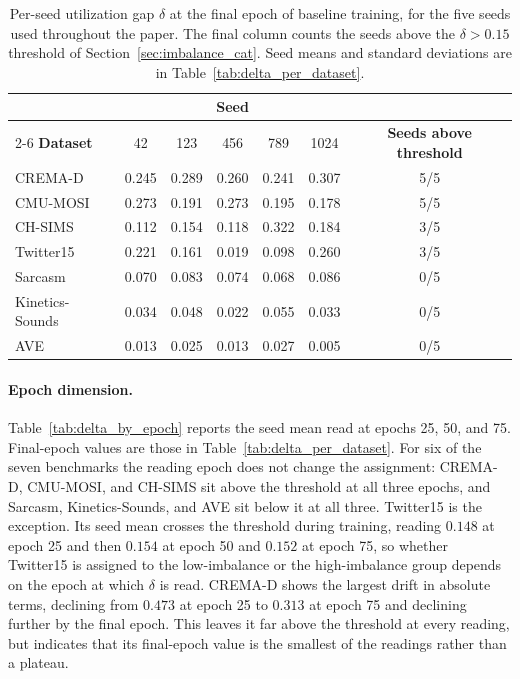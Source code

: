 \documentclass{article}
\begin{document}
\begin{table}[H]
\centering
\caption{Per-seed utilization gap $\delta$ at the final epoch of baseline training, for the five seeds used throughout the paper. The final column counts the seeds above the $\delta > 0.15$ threshold of Section~\ref{sec:imbalance_cat}. Seed means and standard deviations are in Table~\ref{tab:delta_per_dataset}.}
\label{tab:delta_per_seed}
\vspace{0.3em}
\begin{tabular}{lcccccc}
\toprule
& \multicolumn{5}{c}{\textbf{Seed}} & \\
\cmidrule(lr){2-6}
\textbf{Dataset} & 42 & 123 & 456 & 789 & 1024 & \textbf{Seeds above threshold} \\
\midrule
CREMA-D         & 0.245 & 0.289 & 0.260 & 0.241 & 0.307 & 5/5 \\
CMU-MOSI        & 0.273 & 0.191 & 0.273 & 0.195 & 0.178 & 5/5 \\
CH-SIMS         & 0.112 & 0.154 & 0.118 & 0.322 & 0.184 & 3/5 \\
Twitter15       & 0.221 & 0.161 & 0.019 & 0.098 & 0.260 & 3/5 \\
Sarcasm         & 0.070 & 0.083 & 0.074 & 0.068 & 0.086 & 0/5 \\
Kinetics-Sounds & 0.034 & 0.048 & 0.022 & 0.055 & 0.033 & 0/5 \\
AVE             & 0.013 & 0.025 & 0.013 & 0.027 & 0.005 & 0/5 \\
\bottomrule
\end{tabular}
\end{table}

\paragraph{Epoch dimension.} Table~\ref{tab:delta_by_epoch} reports the seed mean read at epochs 25, 50, and 75. Final-epoch values are those in Table~\ref{tab:delta_per_dataset}. For six of the seven benchmarks the reading epoch does not change the assignment: CREMA-D, CMU-MOSI, and CH-SIMS sit above the threshold at all three epochs, and Sarcasm, Kinetics-Sounds, and AVE sit below it at all three. Twitter15 is the exception. Its seed mean crosses the threshold during training, reading $0.148$ at epoch 25 and then $0.154$ at epoch 50 and $0.152$ at epoch 75, so whether Twitter15 is assigned to the low-imbalance or the high-imbalance group depends on the epoch at which $\delta$ is read. CREMA-D shows the largest drift in absolute terms, declining from $0.473$ at epoch 25 to $0.313$ at epoch 75 and declining further by the final epoch. This leaves it far above the threshold at every reading, but indicates that its final-epoch value is the smallest of the readings rather than a plateau.
\end{document}
